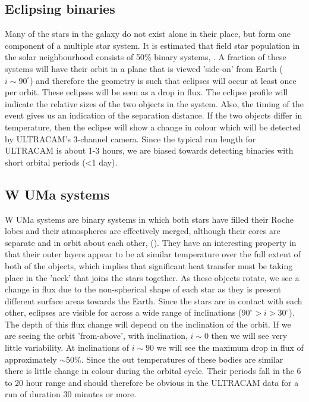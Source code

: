 \subsection{Eclipsing binaries}
Many of the stars in the galaxy do not exist alone in their place, but form one component of a multiple star system. It is estimated that field star population in the solar neighbourhood consists of 50\% binary systems, \cite{binaryfraction}. A fraction of these systems will have their orbit in a plane that is viewed 'side-on' from Earth ($i \sim 90^\circ$) and therefore the geometry is such that eclipses will occur at least once per orbit. These eclipses will be seen as a drop in flux. The eclipse profile will indicate the relative sizes of the two objects in the system. Also, the timing of the event gives us an indication of the separation distance. If the two objects differ in temperature, then the eclipse will show a change in colour which will be detected by ULTRACAM's 3-channel camera. Since the typical run length for ULTRACAM is about 1-3 hours, we are biased towards detecting binaries with short orbital periods (\textless 1 day). 

\subsection{{W UMa} systems}
{W UMa} systems are binary systems in which both stars have filled their Roche lobes and their atmospheres are effectively merged, although their cores are separate and in orbit about each other, (\cite{Lucy68}). They have an interesting property in that their outer layers appear to be at similar temperature over the full extent of both of the objects, which implies that significant heat transfer must be taking place in the 'neck' that joins the stars together. As these objects rotate, we see a change in flux due to the non-spherical shape of each star as they is present different surface areas towards the Earth. Since the stars are in contact with each other, eclipses are visible for across a wide range of inclinations ($90^\circ > i > 30^\circ$). The depth of this flux change will depend on the inclination of the orbit. If we are seeing the orbit 'from-above', with inclination, $i \sim 0$ then we will see very little variability. At inclinations of $i \sim 90$ we will see the maximum drop in flux of approximately $\sim50\%$. Since the out temperatures of these bodies are similar there is little change in colour during the orbital cycle. Their periods fall in the 6 to 20 hour range and should therefore be obvious in the ULTRACAM data for a run of duration 30 minutes or more. 

